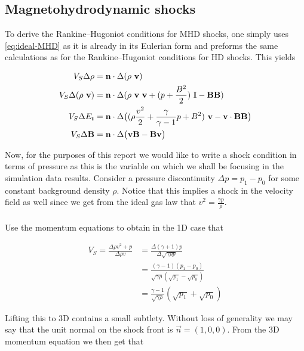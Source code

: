 \subsection*{Magnetohydrodynamic shocks}

To derive the Rankine–Hugoniot conditions for MHD shocks, one simply uses \autoref{eq:ideal-MHD} as it is already in its Eulerian form and preforms the same calculations as for the Rankine–Hugoniot conditions for HD shocks. This yields

\begin{equation}
\label{eq:MHD-shock-conditions}
\begin{split}
V_S \Delta \rho &= \vec{n}\cdot\Delta(\rho \ \vec{v})\\
V_S \Delta (\rho \ \vec{v}) &= \vec{n} \cdot \Delta(\rho \ \vec{v} \ \vec{v} + (p + \frac{B^2}{2}) \ \I -  \vec{B}\vec{B}) \\
V_S \Delta E_t &= \vec{n} \cdot \Delta \big( (\rho \frac{v^2}{2} + \frac{\gamma}{\gamma - 1} p + B^2) \ \vec{v} - \vec{v} \cdot \vec{B} \vec{B} \big) \\
V_S \Delta \vec{B} &= \vec{n} \cdot \Delta \big( \vec{v} \vec{B} - \vec{B} \vec{v} \big)
\end{split}
\end{equation}

Now, for the purposes of this report we would like to write a shock condition in terms of pressure as this is the variable on which we shall be focusing in the simulation data results. Consider a pressure discontinuity $\Delta p = p_1 - p_0$ for some constant background density $\rho$. Notice that this implies a shock in the velocity field as well since we get from the ideal gas law that $ v^2 = \frac{\gamma p}{\rho} $.\\
\\
Use the momentum equations to obtain in the 1D case that

\begin{equation}
\label{eq:p-shock-1D}
\begin{split}
V_S = \frac{\Delta \rho v^2 + p}{\Delta \rho v} &=  \frac{\Delta(\gamma +1) p}{\Delta \sqrt{\gamma \rho p}} \\ &=
\frac{(\gamma - 1)(p_1 - p_0)}{\sqrt{\gamma \rho}(\sqrt{p_1} - \sqrt{p_0})} \\ &=
\frac{\gamma-1}{\sqrt{\gamma \rho}} (\sqrt{p_1} + \sqrt{p_0})
\end{split}
\end{equation}

Lifting this to 3D contains a small subtlety. Without loss of generality we may say that the unit normal on the shock front is $\vec{n} = (1,0,0)$. From the 3D momentum equation we then get that 

